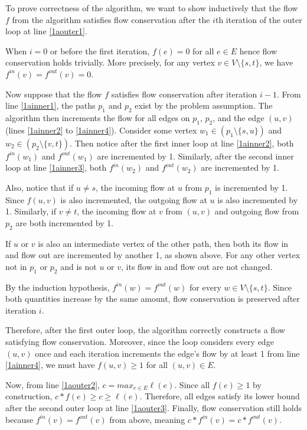 \documentclass[11pt]{exam}
\begin{document}
To prove correctness of the algorithm, we want to show inductively
that the flow $f$ from the algorithm satisfies flow conservation
after the $i$th iteration of the outer loop at line \ref{1aouter1}.

When $i = 0$ or before the first iteration, $f(e) = 0$ for all $e
\in E$ hence flow conservation holds trivially. More precisely, for
any vertex $v \in V \setminus \{s, t\}$, we have $f^\mathit{in} (v) =
f^\mathit{out} (v) = 0$.

Now suppose that the flow $f$ satisfies flow conservation after
iteration $i-1$. From line \ref{1ainner1}, the paths $p_1$ and $p_2$
exist by the problem assumption.
The algorithm then increments the flow for all edges on $p_1$, $p_2$,
and the edge $(u,v)$ (lines \ref{1ainner2} to \ref{1ainner4}).
Consider some vertex $w_1 \in (p_1 \setminus \{s,u\})$ and $w_2 \in (p_2
\setminus \{v,t\})$. Then notice after the first inner loop at line
\ref{1ainner2}, both $f^\mathit{in}(w_1)$ and $f^\mathit{out}(w_1)$
are incremented by 1. Similarly, after the second inner loop at line
\ref{1ainner3}, both $f^\mathit{in}(w_2)$ and $f^\mathit{out}(w_2)$
are incremented by 1.

Also, notice that if $u \neq s$, the incoming flow at $u$ from $p_1$
is incremented by 1. Since $f(u,v)$ is also incremented, the outgoing
flow at $u$ is also incremented by 1. Similarly, if $v \neq t$, the
incoming flow at $v$ from $(u,v)$ and outgoing flow from $p_2$ are
both incremented by 1.

If $u$ or $v$ is also an intermediate vertex of the other path, then
both its flow in and flow out are incremented by another 1, as shown above.
For any other vertex not in $p_1$ or $p_2$ and is not $u$ or $v$, its
flow in and flow out are not changed.

By the induction hypothesis, $f^\mathit{in}(w) = f^\mathit{out}(w)$
for every $w \in V \setminus \{s, t\}$. Since both quantities
increase by the same amount, flow conservation
is preserved after iteration $i$.

Therefore, after the first outer loop, the algorithm correctly
constructs a flow satisfying flow conservation. Moreover, since the
loop considers every edge $(u, v)$ once and each iteration increments
the edge's flow by at least 1 from line \ref{1ainner4}, we must have
$f(u, v) \geq 1$ for all $(u, v) \in E$.

Now, from line \ref{1aouter2}, $c = max_{e \in E} \ell (e)$. Since
all $f(e) \geq 1$ by construction, $c * f(e) \geq c \geq \ell(e)$.
Therefore, all edges satisfy its lower bound after the second outer
loop at line \ref{1aouter3}. Finally, flow conservation still holds
because $f^\mathit{in} (v) = f^\mathit{out} (v)$ from above, meaning
$c * f^\mathit{in} (v) = c * f^\mathit{out} (v)$.
\end{document}
